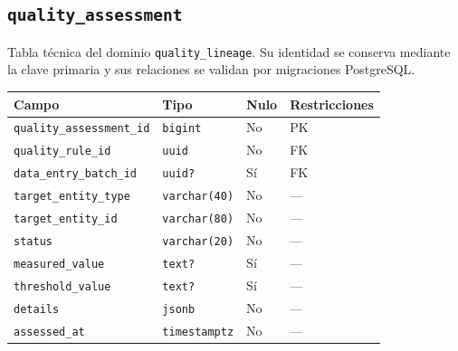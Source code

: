 \documentclass[11pt]{article}
\begin{document}
\subsection{\texttt{quality\_assessment}}
Tabla técnica del dominio \texttt{quality\_lineage}. Su identidad se conserva mediante la clave primaria y sus relaciones se validan por migraciones PostgreSQL.
\begin{longtable}{>{\raggedright\arraybackslash}p{} p{} p{} p{}}
\toprule Campo & Tipo & Nulo & Restricciones \\ \midrule\endhead
\texttt{quality\_assessment\_id} & \texttt{bigint} & No & PK \\
\texttt{quality\_rule\_id} & \texttt{uuid} & No & FK \\
\texttt{data\_entry\_batch\_id} & \texttt{uuid?} & Sí & FK \\
\texttt{target\_entity\_type} & \texttt{varchar(40)} & No & --- \\
\texttt{target\_entity\_id} & \texttt{varchar(80)} & No & --- \\
\texttt{status} & \texttt{varchar(20)} & No & --- \\
\texttt{measured\_value} & \texttt{text?} & Sí & --- \\
\texttt{threshold\_value} & \texttt{text?} & Sí & --- \\
\texttt{details} & \texttt{jsonb} & No & --- \\
\texttt{assessed\_at} & \texttt{timestamptz} & No & --- \\
\bottomrule\end{longtable}
\end{document}
